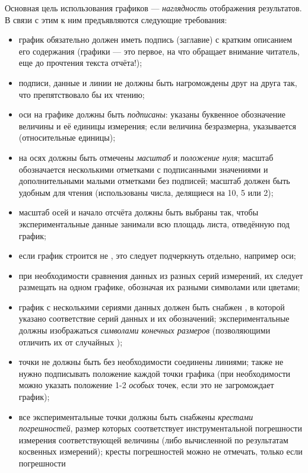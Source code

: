 Основная цель использования графиков --- \emph{наглядность}
отображения результатов. В связи с этим к ним
предъявляются следующие требования:
\begin{itemize}
    \small
    \item график обязательно должен иметь подпись (заглавие) с кратким описанием его
содержания (графики --- это первое, на что обращает внимание читатель, еще до прочтения текста отчёта!);
\item подписи, данные и линии не должны быть нагромождены друг на друга
так, что препятствовало бы их чтению;
    \item оси на графике должны быть \emph{подписаны}: указаны буквенное
обозначение
величины и её единицы измерения; если величина безразмерна, указывается
 (относительные единицы);
    \item на осях должны быть отмечены \emph{масштаб} и \emph{положение нуля};
масштаб обозначается несколькими отметками с подписанными значениями
и дополнительными малыми отметками без подписей; масштаб должен быть
удобным для чтения (использованы 
числа, делящиеся на 10, 5 или 2);
    \item масштаб осей и начало отсчёта должны быть выбраны так, чтобы
экспериментальные
данные занимали всю площадь листа, отведённую под график;
    \item если график строится не , это
следует подчеркнуть отдельно, например 
оси;
    \item при необходимости сравнения данных из разных серий измерений, их
следует
размещать на одном графике, обозначая их разными символами или цветами;
    \item график с несколькими сериями данных должен быть снабжен ,
в которой указано соответствие серий данных и их обозначений; экспериментальные
 должны изображаться \emph{символами
конечных размеров} (позволяющими отличить их от случайных );
    \item точки не должны быть без необходимости соединены линиями; также не
нужно подписывать положение каждой точки графика (при необходимости
можно указать положение 1-2 \emph{особых} точек, если это не загромождает
график);
    \item все экспериментальные точки должны быть снабжены \emph{крестами
погрешностей},
размер которых соответствует инструментальной погрешности измерения
соответствующей величины (либо вычисленной по результатам косвенных
измерений); кресты погрешностей можно не отмечать, только если погрешности

\end{itemize}
